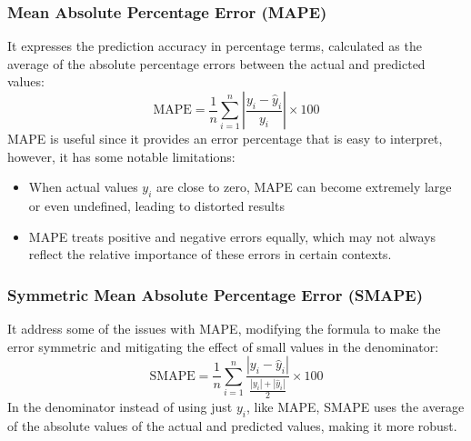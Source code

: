 \subsubsection{Mean Absolute Percentage Error (MAPE)}
It expresses the prediction accuracy in percentage terms, calculated as the average of the absolute percentage errors between the actual and predicted values:
\[
\text{MAPE} = \frac{1}{n} \sum_{i=1}^{n} \left| \frac{y_i - \hat{y}_i}{y_i} \right| \times 100
\]
MAPE is useful since it provides an error percentage that is easy to interpret, however, it has some notable limitations:
\begin{itemize}
    \item When actual values \( y_i \) are close to zero, MAPE can become extremely large or even undefined, leading to distorted results
    \item MAPE treats positive and negative errors equally, which may not always reflect the relative importance of these errors in certain contexts.
\end{itemize}

\subsubsection{Symmetric Mean Absolute Percentage Error (SMAPE)}
It address some of the issues with MAPE, modifying the formula to make the error symmetric and mitigating the effect of small values in the denominator:
\[
\text{SMAPE} = \frac{1}{n} \sum_{i=1}^{n} \frac{|y_i - \hat{y}_i|}{\frac{|y_i| + |\hat{y}_i|}{2}} \times 100
\]
In the denominator instead of using just \( y_i \), like MAPE, SMAPE uses the average of the absolute values of the actual and predicted values, making it more robust.



